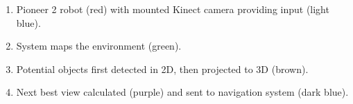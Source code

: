 
\begin{enumerate}
	\item Pioneer 2 robot (red) with mounted Kinect camera providing input (light blue).
	\item System maps the environment (green).
	\item Potential objects first detected in 2D, then projected to 3D (brown).
	\item Next best view calculated (purple) and sent to navigation system (dark blue).
\end{enumerate}